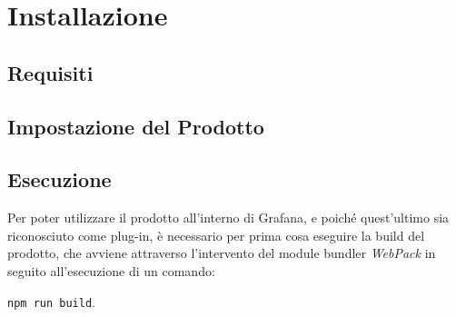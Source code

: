 \section{Installazione}\label{Installazione}

\subsection{Requisiti}\label{Requisiti}

\subsection{Impostazione del Prodotto}\label{Setup}

\subsection{Esecuzione}\label{run}
Per poter utilizzare il prodotto all'interno di Grafana, e poiché quest'ultimo sia riconosciuto come plug-in, è necessario per prima cosa eseguire la build  del prodotto, che avviene attraverso l'intervento del module bundler \textit{WebPack} in seguito all'esecuzione di un comando:
\begin{center}
	\texttt{npm run build}.
\end{center}